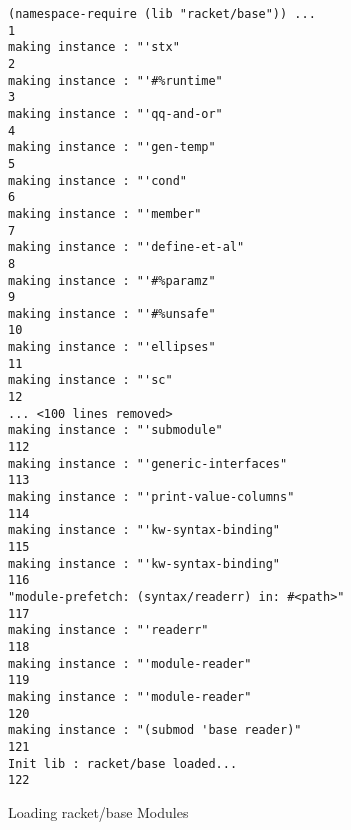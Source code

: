 \begin{figure}[!htbp]
  \centering
  \begin{minipage}{0.7\textwidth}
  \begin{lstlisting}[style=bashstyle]
(namespace-require (lib "racket/base")) ...                1
making instance : "'stx"                                   2
making instance : "'#%runtime"                             3
making instance : "'qq-and-or"                             4
making instance : "'gen-temp"                              5
making instance : "'cond"                                  6
making instance : "'member"                                7
making instance : "'define-et-al"                          8
making instance : "'#%paramz"                              9
making instance : "'#%unsafe"                             10
making instance : "'ellipses"                             11
making instance : "'sc"                                   12
... <100 lines removed>
making instance : "'submodule"                           112
making instance : "'generic-interfaces"                  113
making instance : "'print-value-columns"                 114
making instance : "'kw-syntax-binding"                   115
making instance : "'kw-syntax-binding"                   116
"module-prefetch: (syntax/readerr) in: #<path>"          117
making instance : "'readerr"                             118
making instance : "'module-reader"                       119
making instance : "'module-reader"                       120
making instance : "(submod 'base reader)"                121
Init lib : racket/base loaded...                         122
  \end{lstlisting}
  \end{minipage}
  \caption{Loading racket/base Modules}
  \label{fig:racket-base-loading-no-compiled}
\end{figure}

